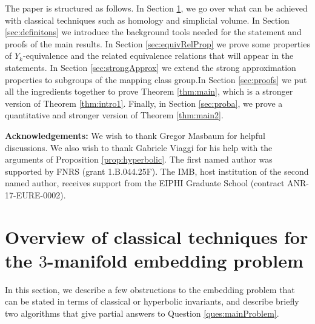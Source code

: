 \documentclass[12pt]{amsart}
\theoremstyle{definition}
\begin{document}
The paper is structured as follows. In Section \ref{sec:overview}, we go over what can be achieved with classical techniques such as homology and simplicial volume. In Section \ref{sec:definitons} we introduce the background tools needed for the statement and proofs of the main results. In Section \ref{sec:equivRelProp} we prove some properties of $Y_k$-equivalence and the related equivalence relations that will appear in the statements. In Section \ref{sec:strongApprox} we extend the strong approximation properties to subgroups of the mapping class group.In Section \ref{sec:proofs} we put all the ingredients together to prove Theorem \ref{thm:main}, which is a stronger version of Theorem \ref{thm:intro1}. Finally, in Section \ref{sec:proba}, we prove a quantitative and stronger version of Theorem \ref{thm:main2}.
 
 
\textbf{Acknowledgements:} We wish to thank Gregor Masbaum for helpful discussions. We also wish to thank Gabriele Viaggi for his help with the arguments of Proposition \ref{prop:hyperbolic}. The first named author was supported by FNRS (grant 1.B.044.25F). The IMB, host institution of the second named author, receives support from the EIPHI Graduate School (contract ANR-17-EURE-0002).



\section{Overview of classical techniques for the $3$-manifold embedding problem}
\label{sec:overview}

In this section, we describe a few obstructions to the embedding problem that can be stated in terms of classical or hyperbolic invariants, and describe briefly two algorithms that give partial answers to Question \ref{ques:mainProblem}.
\end{document}
